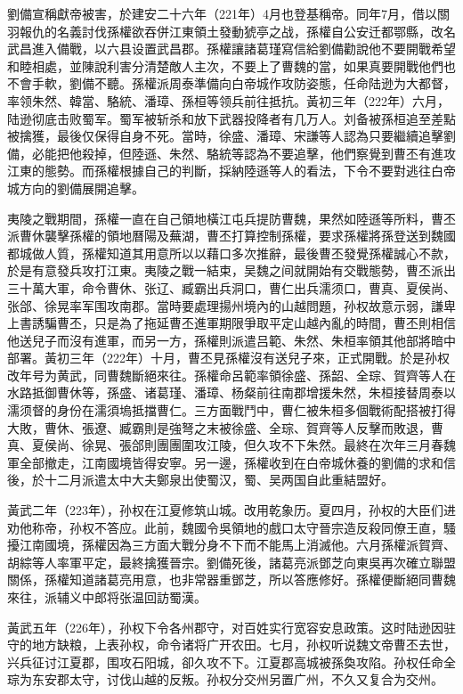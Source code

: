 劉備宣稱獻帝被害，於建安二十六年（221年）4月也登基稱帝。同年7月，借以關羽報仇的名義討伐孫權欲吞併江東領土發動猇亭之战，孫權自公安迁都鄂縣，改名武昌進入備戰，以六县设置武昌郡。孫權讓諸葛瑾寫信給劉備勸說他不要開戰希望和睦相處，並陳說利害分清楚敵人主次，不要上了曹魏的當，如果真要開戰他們也不會手軟，劉備不聽。孫權派周泰準備向白帝城作攻防姿態，任命陆逊为大都督，率领朱然、韓當、駱統、潘璋、孫桓等领兵前往抵抗。黃初三年（222年）六月，陆逊彻底击败蜀军。蜀军被斩杀和放下武器投降者有几万人。刘备被孫桓追至差點被擒獲，最後仅保得自身不死。當時，徐盛、潘璋、宋謙等人認為只要繼續追擊劉備，必能把他殺掉，但陸遜、朱然、駱統等認為不要追擊，他們察覺到曹丕有進攻江東的態勢。而孫權根據自己的判斷，採納陸遜等人的看法，下令不要對逃往白帝城方向的劉備展開追擊。

夷陵之戰期間，孫權一直在自己領地橫江屯兵提防曹魏，果然如陸遜等所料，曹丕派曹休襲擊孫權的領地曆陽及蕪湖，曹丕打算控制孫權，要求孫權將孫登送到魏國都城做人質，孫權知道其用意所以以藉口多次推辭，最後曹丕發覺孫權誠心不款，於是有意發兵攻打江東。夷陵之戰一結束，吴魏之间就開始有交戰態勢，曹丕派出三十萬大軍，命令曹休、张辽、臧霸出兵洞口，曹仁出兵濡须口，曹真、夏侯尚、张郃、徐晃率军围攻南郡。當時要處理揚州境內的山越問題，孙权故意示弱，謙卑上書誘騙曹丕，只是為了拖延曹丕進軍期限爭取平定山越內亂的時間，曹丕則相信他送兒子而沒有進軍，而另一方，孫權則派遣吕範、朱然、朱桓率領其他部將暗中部署。黃初三年（222年）十月，曹丕見孫權沒有送兒子來，正式開戰。於是孙权改年号为黄武，同曹魏斷絕來往。孫權命呂範率領徐盛、孫韶、全琮、賀齊等人在水路抵御曹休等，孫盛、诸葛瑾、潘璋、杨粲前往南郡增援朱然，朱桓接替周泰以濡须督的身份在濡須塢抵擋曹仁。三方面戰鬥中，曹仁被朱桓多個戰術配搭被打得大敗，曹休、張遼、臧霸則是強弩之末被徐盛、全琮、賀齊等人反擊而敗退，曹真、夏侯尚、徐晃、張郃則團團圍攻江陵，但久攻不下朱然。最終在次年三月春魏軍全部撤走，江南國境皆得安寧。另一邊，孫權收到在白帝城休養的劉備的求和信後，於十二月派遣太中大夫鄭泉出使蜀汉，蜀、吴两国自此重結盟好。

黃武二年（223年），孙权在江夏修筑山城。改用乾象历。夏四月，孙权的大臣们进劝他称帝，孙权不答应。此前，魏國令吳領地的戲口太守晉宗造反殺同僚王直，騷擾江南國境，孫權因為三方面大戰分身不下而不能馬上消滅他。六月孫權派賀齊、胡綜等人率軍平定，最終擒獲晉宗。劉備死後，諸葛亮派鄧芝向東吳再次確立聯盟關係，孫權知道諸葛亮用意，也非常器重鄧芝，所以答應修好。孫權便斷絕同曹魏來往，派辅义中郎将张温回訪蜀漢。

黃武五年（226年），孙权下令各州郡守，对百姓实行宽容安息政策。这时陆逊因驻守的地方缺粮，上表孙权，命令诸将广开农田。七月，孙权听说魏文帝曹丕去世，兴兵征讨江夏郡，围攻石阳城，卻久攻不下。江夏郡高城被孫奐攻陷。孙权任命全琮为东安郡太守，讨伐山越的反叛。孙权分交州另置广州，不久又复合为交州。


